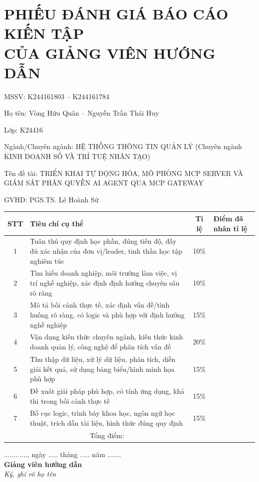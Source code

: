 \documentclass[a4paper]{article}
\newcommand{\tennganh}{HỆ THỐNG THÔNG TIN QUẢN LÝ}
\newcommand{\tenchuyennganh}{KINH DOANH SỐ VÀ TRÍ TUỆ NHÂN TẠO}
\newcommand{\tendetai}{TRIỂN KHAI TỰ ĐỘNG HÓA, MÔ PHỎNG MCP SERVER VÀ GIÁM SÁT PHÂN QUYỀN AI AGENT QUA MCP GATEWAY}
\newcommand{\gvhd}{PGS.TS. Lê Hoành Sử}
\newcommand{\svthA}{Vòng Hữu Quân}
\newcommand{\mssvA}{K244161803}
\newcommand{\svthB}{Nguyễn Trần Thái Huy}
\newcommand{\mssvB}{K244161784}
\newcommand{\svth}{\svthA{} -- \svthB}
\newcommand{\mssv}{\mssvA{} -- \mssvB}
\newcommand{\lop}{K24416}
\begin{document}
\section*{PHIẾU ĐÁNH GIÁ BÁO CÁO KIẾN TẬP\\ CỦA GIẢNG VIÊN HƯỚNG DẪN}
{\setlength{\parskip}{0pt}\singlespacing
MSSV: \mssv

Họ tên: \svth

Lớp: \lop

Ngành/Chuyên ngành: \tennganh{} (Chuyên ngành \tenchuyennganh)

Tên đề tài: \tendetai

GVHD: \gvhd
\par}
\vspace{6pt}
{\singlespacing\renewcommand{\arraystretch}{1.3}\noindent
\begin{tabularx}{\textwidth}{|c|>{\centering\arraybackslash}X|c|>{\centering\arraybackslash}p{2.2cm}|}\hline
\textbf{STT} & \textbf{Tiêu chí cụ thể} & \textbf{Tỉ lệ} & \textbf{Điểm đã nhân tỉ lệ} \\ \hline
1 & Tuân thủ quy định học phần, đúng tiến độ, đầy đủ xác nhận của đơn vị/leader, tinh thần học tập nghiêm túc & 10\% & \\ \hline
2 & Tìm hiểu doanh nghiệp, môi trường làm việc, vị trí nghề nghiệp, xác định định hướng chuyên sâu rõ ràng & 10\% & \\ \hline
3 & Mô tả bối cảnh thực tế, xác định vấn đề/tình huống rõ ràng, có logic và phù hợp với định hướng nghề nghiệp & 15\% & \\ \hline
4 & Vận dụng kiến thức chuyên ngành, kiến thức kinh doanh quản lý, công nghệ để phân tích vấn đề & 20\% & \\ \hline
5 & Thu thập dữ liệu, xử lý dữ liệu, phân tích, diễn giải kết quả, sử dụng bảng biểu/hình minh họa phù hợp & 15\% & \\ \hline
6 & Đề xuất giải pháp phù hợp, có tính ứng dụng, khả thi trong bối cảnh thực tế & 15\% & \\ \hline
7 & Bố cục logic, trình bày khoa học, ngôn ngữ học thuật, trích dẫn tài liệu, hình thức đúng quy định & 15\% & \\ \hline
\multicolumn{3}{|c|}{Tổng điểm:} & \\[12pt] \hline
\end{tabularx}}

\vspace{6pt}
\hfill\begin{minipage}{8cm}\centering
............, ngày ..... tháng ..... năm .......\\
\textbf{Giảng viên hướng dẫn}\\
\textit{Ký, ghi rõ họ tên}
\end{minipage}
\end{document}
